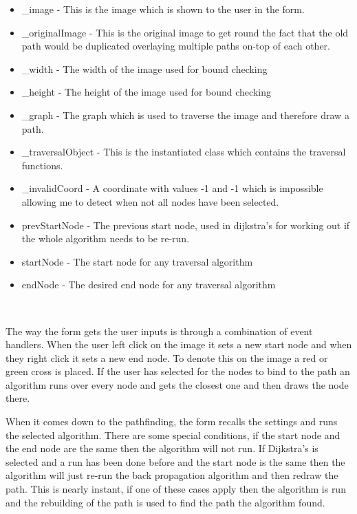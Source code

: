 \begin{FlushLeft}
    \begin{itemize}
        \item \_image - This is the image which is shown to the user in the form.
        \item \_originalImage - This is the original image to get round the fact that the old path would be duplicated overlaying multiple paths on-top of each other.
        \item \_width - The width of the image used for bound checking
        \item \_height - The height of the image used for bound checking
        \item \_graph - The graph which is used to traverse the image and therefore draw a path.
        \item \_traversalObject - This is the instantiated class which contains the traversal functions.
        \item \_invalidCoord - A coordinate with values -1 and -1 which is impossible allowing me to detect when not all nodes have been selected.
        \item prevStartNode - The previous start node, used in dijkstra's for working out if the whole algorithm needs to be re-run.
        \item startNode - The start node for any traversal algorithm
        \item endNode - The desired end node for any traversal algorithm
    \end{itemize}\\ \bk

    The way the form gets the user inputs is through a combination of event handlers. When the user left click on the image it sets a new start node and when they right click it sets a new end node. To denote this on the image a red or green cross is placed. If the user has selected for the nodes to bind to the path an algorithm runs over every node and gets the closest one and then draws the node there. \\ \bk

    When it comes down to the pathfinding, the form recalls the settings and runs the selected algorithm. There are some special conditions, if the start node and the end node are the same then the algorithm will not run. If Dijkstra's is selected and a run has been done before and the start node is the same then the algorithm will just re-run the back propagation algorithm and then redraw the path. This is nearly instant, if one of these cases apply then the algorithm is run and the rebuilding of the path is used to find the path the algorithm found. \\ \bk


\end{FlushLeft}
